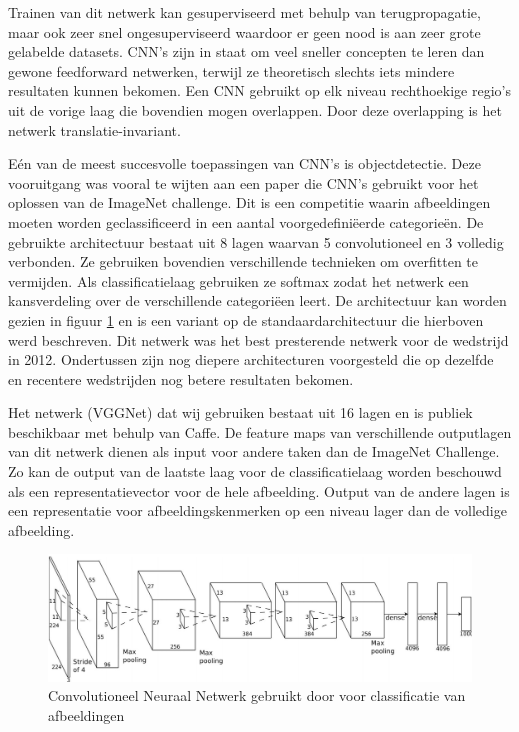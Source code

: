 Trainen van dit netwerk kan gesuperviseerd met behulp van terugpropagatie, maar ook zeer snel ongesuperviseerd waardoor er geen nood is aan zeer grote gelabelde datasets. CNN's zijn in staat om veel sneller concepten te leren dan gewone feedforward netwerken, terwijl ze theoretisch slechts iets mindere resultaten kunnen bekomen. Een CNN gebruikt op elk niveau rechthoekige regio's uit de vorige laag die bovendien mogen overlappen. Door deze overlapping is het netwerk translatie-invariant.

E\'en van de meest succesvolle toepassingen van CNN's is objectdetectie. Deze vooruitgang was vooral te wijten aan een paper\cite{Krizhevsky2012a} die CNN's gebruikt voor het oplossen van de ImageNet challenge.\cite{Russakovsky2014}
Dit is een competitie waarin afbeeldingen moeten worden geclassificeerd in een aantal voorgedefini\"eerde categorie\"en. De gebruikte architectuur bestaat uit 8 lagen waarvan 5 convolutioneel en 3 volledig verbonden. Ze gebruiken bovendien verschillende technieken om overfitten te vermijden. Als classificatielaag gebruiken ze softmax zodat het netwerk een kansverdeling over de verschillende categori\"een leert. De architectuur kan worden gezien in figuur \ref{fig:AlexNet} en  is een variant op de standaardarchitectuur die hierboven werd beschreven. Dit netwerk was het best presterende netwerk voor de wedstrijd in 2012. Ondertussen zijn nog diepere architecturen voorgesteld die op dezelfde en recentere wedstrijden nog betere resultaten bekomen.

Het netwerk (VGGNet)\cite{Arge2015} dat wij gebruiken bestaat uit 16 lagen en is publiek beschikbaar met behulp van Caffe\cite{Jia2014}. De feature maps van verschillende outputlagen van dit netwerk dienen als input voor andere taken dan de ImageNet Challenge. Zo kan de output van de laatste laag voor de classificatielaag worden beschouwd als een representatievector voor de hele afbeelding. Output van de andere lagen is een representatie voor afbeeldingskenmerken op een niveau lager dan de volledige afbeelding.
\begin{figure}[tb]
	\centering
	\includegraphics[width=\linewidth]{Images/cnn.PNG}
	\caption{Convolutioneel Neuraal Netwerk gebruikt door \cite{Krizhevsky2012a} voor classificatie van afbeeldingen}
	\label{fig:AlexNet}
\end{figure}

